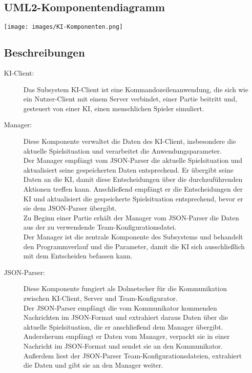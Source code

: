 \subsection{UML2-Komponentendiagramm}
\begin{center}
	\texttt{[image: images/KI-Komponenten.png]}
\end{center}

\subsection{Beschreibungen}
\begin{description}
	\item[KI-Client:] 
	Das Subsystem KI-Client ist eine Kommandozeilenanwendung, die sich wie ein Nutzer-Client mit einem Server verbindet, einer Partie beitritt und, gesteuert von einer KI, einen menschlichen Spieler simuliert. 
	\\
	\item[Manager:]
	Diese Komponente verwaltet die Daten des KI-Client, insbesondere die aktuelle Spielsituation und verarbeitet die Anwendungsparameter.\\ Der Manager empfängt vom JSON-Parser die aktuelle Spielsituation und aktualisiert seine gespeicherten Daten entsprechend. Er übergibt seine Daten an die KI, damit diese Entscheidungen über die durchzuführenden Aktionen treffen kann. Anschließend empfängt er die Entscheidungen der KI und aktualisiert die gespeicherte Spielsituation entsprechend, bevor er sie dem JSON-Parser übergibt.\\
	Zu Beginn einer Partie erhält der Manager vom JSON-Parser die Daten aus der zu verwendende Team-Konfigurationsdatei. \\
	Der Manager ist die zentrale Komponente des Subsystems und behandelt den Programmverlauf und die Parameter, damit die KI sich ausschließlich mit dem Entscheiden befassen kann.
	\\
	\item[JSON-Parser:]
	Diese Komponente fungiert als Dolmetscher für die Kommunikation zwischen KI-Client, Server und Team-Konfigurator.\\
	Der JSON-Parser empfängt die vom Kommunikator kommenden Nachrichten im JSON-Format und extrahiert daraus Daten über die aktuelle Spielsituation, die er anschließend dem Manager übergibt. Andersherum empfängt er Daten vom Manager, verpackt sie in einer Nachricht im JSON-Format und sendet sie an den Kommunikator.\\
	Außerdem liest der JSON-Parser Team-Konfigurationsdateien, extrahiert die Daten und gibt sie an den Manager weiter.\\

\end{description}
